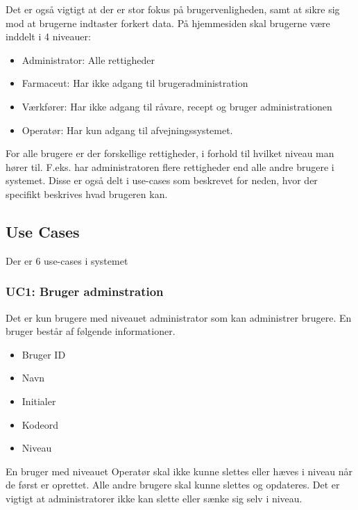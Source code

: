 \documentclass[a4paper]{article}
\begin{document}
Det er også vigtigt at der er stor fokus på brugervenligheden, samt at sikre sig mod at brugerne indtaster forkert data. På hjemmesiden skal brugerne være inddelt i 4 niveauer:

\begin{itemize}
  \item Administrator: Alle rettigheder
  \item Farmaceut: Har ikke adgang til brugeradministration
  \item Værkfører: Har ikke adgang til råvare, recept og bruger administrationen 
  \item Operatør: Har kun adgang til afvejningssystemet. 
\end{itemize}

For alle brugere er der forskellige rettigheder, i forhold til hvilket niveau man hører til. F.eks. har administratoren flere rettigheder end alle andre brugere i systemet. Disse er også delt i use-cases som beskrevet for neden, hvor der specifikt beskrives hvad brugeren kan. 


\subsection{Use Cases} %

Der er 6 use-cases i systemet

\subsubsection{UC1: Bruger adminstration} %

Det er kun brugere med niveauet administrator som kan administrer brugere. En bruger består af følgende informationer.

\begin{itemize}
  \item Bruger ID
  \item Navn
  \item Initialer
  \item Kodeord
  \item Niveau
\end{itemize}

En bruger med niveauet Operatør skal ikke kunne slettes eller hæves i niveau når de først er oprettet.  Alle andre brugere skal kunne slettes og opdateres. Det er vigtigt at administratorer ikke kan slette eller sænke sig selv i niveau.   

\end{document}
